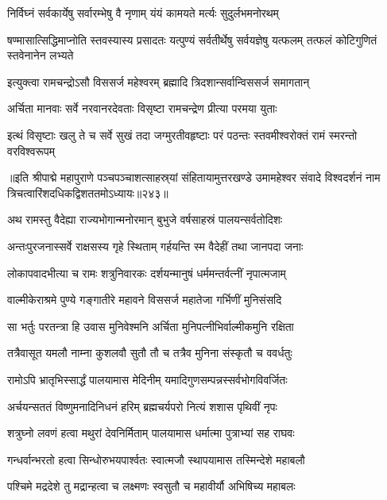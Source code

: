 \twolineshloka
{निर्विघ्नं सर्वकार्येषु सर्वारम्भेषु वै नृणाम्}
{यंयं कामयते मर्त्यः सुदुर्लभमनोरथम्}%


\threelineshloka
{षण्मासात्सिद्धिमाप्नोति स्तवस्यास्य प्रसादतः}
{यत्पुण्यं सर्वतीर्थेषु सर्वयज्ञेषु यत्फलम्}
{तत्फलं कोटिगुणितं स्तवेनानेन लभ्यते}%


\twolineshloka
{इत्युक्त्वा रामचन्द्रोऽसौ विससर्ज महेश्वरम्}
{ब्रह्मादि त्रिदशान्सर्वान्विससर्ज समागतान्}%

\twolineshloka
{अर्चिता मानवाः सर्वे नरवानरदेवताः}
{विसृष्टा रामचन्द्रेण प्रीत्या परमया युताः}%

\twolineshloka
{इत्थं विसृष्टाः खलु ते च सर्वे सुखं तदा जग्मुरतीवहृष्टाः}
{परं पठन्तः स्तवमीश्वरोक्तं रामं स्मरन्तो वरविश्वरूपम्}%

{॥इति श्रीपाद्मे महापुराणे पञ्चपञ्चाशत्साहस्र्यां संहितायामुत्तरखण्डे उमामहेश्वर संवादे विश्वदर्शनं नाम त्रिचत्वारिंशदधिकद्विशततमोऽध्यायः॥२४३॥}



\twolineshloka
{अथ रामस्तु वैदेह्या राज्यभोगान्मनोरमान्}
{बुभुजे वर्षसाहस्रं पालयन्सर्वतोदिशः}%

\twolineshloka
{अन्तःपुरजनास्सर्वे राक्षसस्य गृहे स्थिताम्}
{गर्हयन्ति स्म वैदेहीं तथा जानपदा जनाः}%

\twolineshloka
{लोकापवादभीत्या च रामः शत्रुनिवारकः}
{दर्शयन्मानुषं धर्ममन्तर्वत्नीं नृपात्मजाम्}%

\twolineshloka
{वाल्मीकेराश्रमे पुण्ये गङ्गातीरे महावने}
{विससर्ज महातेजा गर्भिणीं मुनिसंसदि}%

\twolineshloka
{सा भर्तुः परतन्त्रा हि उवास मुनिवेश्मनि}
{अर्चिता मुनिपत्नीभिर्वाल्मीकमुनि रक्षिता}%

\twolineshloka
{तत्रैवासूत यमलौ नाम्ना कुशलवौ सुतौ}
{तौ च तत्रैव मुनिना संस्कृतौ च ववर्धतुः}%

\twolineshloka
{रामोऽपि भ्रातृभिस्सार्द्धं पालयामास मेदिनीम्}
{यमादिगुणसम्पन्नस्सर्वभोगविवर्जितः}%

\twolineshloka
{अर्चयन्सततं विष्णुमनादिनिधनं हरिम्}
{ब्रह्मचर्यपरो नित्यं शशास पृथिवीं नृपः}%

\twolineshloka
{शत्रुघ्नो लवणं हत्वा मथुरां देवनिर्मिताम्}
{पालयामास धर्मात्मा पुत्राभ्यां सह राघवः}%

\twolineshloka
{गन्धर्वान्भरतो हत्वा सिन्धोरुभयपार्श्वतः}
{स्वात्मजौ स्थापयामास तस्मिन्देशे महाबलौ}%

\twolineshloka
{पश्चिमे मद्रदेशे तु मद्रान्हत्वा च लक्ष्मणः}
{स्वसुतौ च महावीर्यौ अभिषिच्य महाबलः}%

